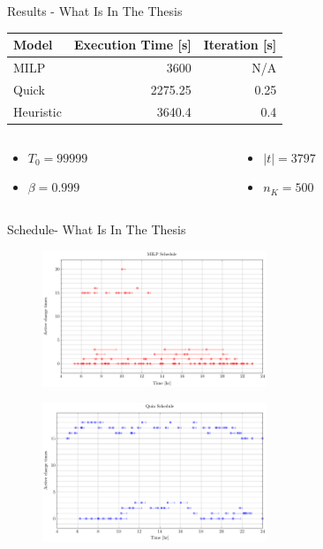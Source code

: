 \documentclass[bigger]{beamer}
\begin{document}
\begin{frame}[label={sec:orgc410f74}]{Results - What Is In The Thesis}
\begin{center}
\begin{tabular}{lrr}
\alert{Model} & \alert{Execution Time} [s] & \alert{Iteration} [s]\\[0pt]
\hline
MILP & 3600 & N/A\\[0pt]
Quick & 2275.25 & 0.25\\[0pt]
Heuristic & 3640.4 & 0.4\\[0pt]
\end{tabular}
\end{center}

\begin{columns}
\begin{column}{0.5\columnwidth}
\begin{itemize}
\item \(T_0 = 99999\)
\item \(\beta = 0.999\)
\end{itemize}
\end{column}
\begin{column}{0.5\columnwidth}
\begin{itemize}
\item \(|t| = 3797\)
\item \(n_K = 500\)
\end{itemize}
\end{column}
\end{columns}
\end{frame}

\begin{frame}[label={sec:orgeb74b81}]{Schedule- What Is In The Thesis}
\begin{figure}[htpb]
\centering
    \includegraphics[width=0.6\textwidth]{img/sa-pap-paper-bad/schedule-milp}
\end{figure}
\begin{figure}[htpb]
\centering
    \includegraphics[width=0.6\textwidth]{img/sa-pap-paper-bad/schedule-quinn}
\end{figure}
\end{frame}
\end{document}
